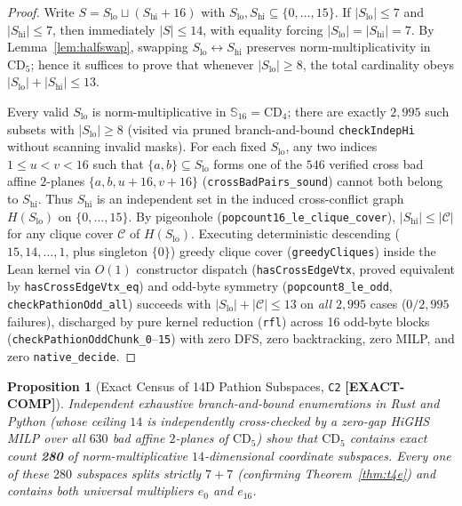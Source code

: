 \documentclass[11pt,reqno]{amsart}
\newcommand{\code}[1]{\textnormal{\texttt{\small\nolinkurl{#1}}}}
\theoremstyle{plain}
\newtheorem{proposition}[theorem]{Proposition}
\theoremstyle{definition}
\theoremstyle{remark}
\newcommand{\tagComp}{\mbox{\textsf{\textbf{\color{oiGreen}[EXACT-COMP]}}}}
\newcommand{\CD}{\mathrm{CD}}
\newcommand{\SSed}{\mathbb{S}_{16}}
\begin{document}
\begin{proof}
Write $S = S_{\mathrm{lo}} \sqcup (S_{\mathrm{hi}} + 16)$ with
$S_{\mathrm{lo}}, S_{\mathrm{hi}} \subseteq \{0, \dots, 15\}$. If $|S_{\mathrm{lo}}| \le 7$ and
$|S_{\mathrm{hi}}| \le 7$, then immediately $|S| \le 14$, with equality forcing
$|S_{\mathrm{lo}}| = |S_{\mathrm{hi}}| = 7$. By Lemma~\ref{lem:halfswap}, swapping
$S_{\mathrm{lo}} \leftrightarrow S_{\mathrm{hi}}$ preserves norm-multiplicativity in $\CD_5$;
hence it suffices to prove that whenever $|S_{\mathrm{lo}}| \ge 8$, the total cardinality obeys
$|S_{\mathrm{lo}}| + |S_{\mathrm{hi}}| \le 13$.

Every valid $S_{\mathrm{lo}}$ is norm-multiplicative in $\SSed = \CD_4$; there are exactly
$2{,}995$ such subsets with $|S_{\mathrm{lo}}| \ge 8$ (visited via pruned branch-and-bound
\code{checkIndepHi} without scanning invalid masks). For each fixed $S_{\mathrm{lo}}$, any two
indices $1 \le u < v < 16$ such that $\{a, b\} \subseteq S_{\mathrm{lo}}$ forms one of the
$546$ verified cross bad affine $2$-planes $\{a, b, u+16, v+16\}$
(\code{crossBadPairs_sound}) cannot both belong to $S_{\mathrm{hi}}$. Thus $S_{\mathrm{hi}}$ is
an independent set in the induced cross-conflict graph $H(S_{\mathrm{lo}})$ on $\{0,\dots,15\}$.
By pigeonhole (\code{popcount16_le_clique_cover}), $|S_{\mathrm{hi}}| \le |\mathcal{C}|$ for any
clique cover $\mathcal{C}$ of $H(S_{\mathrm{lo}})$. Executing deterministic descending
($15, 14, \dots, 1$, plus singleton $\{0\}$) greedy clique cover (\code{greedyCliques}) inside
the Lean kernel via $O(1)$ constructor dispatch (\code{hasCrossEdgeVtx}, proved equivalent by
\code{hasCrossEdgeVtx_eq}) and odd-byte symmetry (\code{popcount8_le_odd}, \code{checkPathionOdd_all})
succeeds with $|S_{\mathrm{lo}}| + |\mathcal{C}| \le 13$ on \emph{all} $2{,}995$ cases
($0/2{,}995$ failures), discharged by pure kernel reduction (\code{rfl}) across 16 odd-byte blocks
(\code{checkPathionOddChunk_0}--\code{15}) with zero DFS, zero backtracking, zero MILP, and
zero \code{native_decide}.
\end{proof}

\begin{proposition}[Exact Census of 14D Pathion Subspaces, \texttt{C2} \tagComp]
\label{prop:pathion_census}
Independent exhaustive branch-and-bound enumerations in Rust and Python (whose ceiling $14$ is
independently cross-checked by a zero-gap HiGHS MILP over all $630$ bad affine $2$-planes of $\CD_5$)
show that $\CD_5$ contains exact count \textbf{280} of norm-multiplicative $14$-dimensional
coordinate subspaces. Every one of these $280$ subspaces splits strictly $7 + 7$ (confirming
Theorem~\ref{thm:t4e}) and contains both universal multipliers $e_0$ and $e_{16}$.
\end{proposition}
\end{document}
